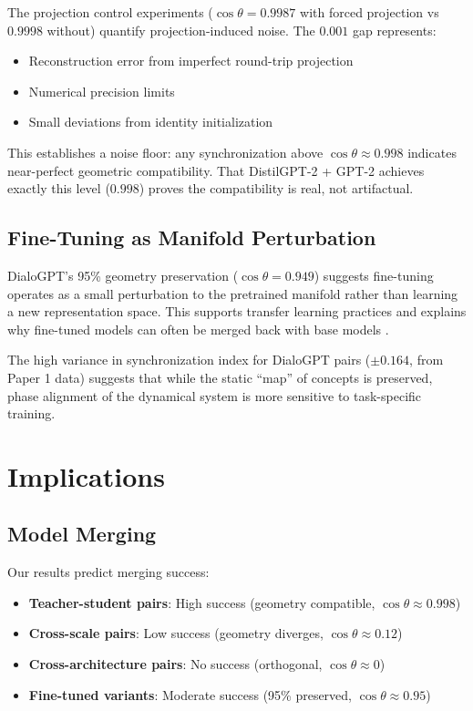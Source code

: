 \documentclass[10pt]{article} %
\theoremstyle{plain}
\theoremstyle{definition}
\theoremstyle{remark}
\begin{document}
The projection control experiments ($\cos \theta = 0.9987$ with forced projection vs $0.9998$ without) quantify projection-induced noise. The $0.001$ gap represents:
\begin{itemize}
    \item Reconstruction error from imperfect round-trip projection
    \item Numerical precision limits
    \item Small deviations from identity initialization
\end{itemize}

This establishes a noise floor: any synchronization above $\cos \theta \approx 0.998$ indicates near-perfect geometric compatibility. That DistilGPT-2 + GPT-2 achieves exactly this level ($0.998$) proves the compatibility is real, not artifactual.

\subsection{Fine-Tuning as Manifold Perturbation}

DialoGPT's 95\% geometry preservation ($\cos \theta = 0.949$) suggests fine-tuning operates as a small perturbation to the pretrained manifold rather than learning a new representation space. This supports transfer learning practices and explains why fine-tuned models can often be merged back with base models \citep{wortsman2022model}.

The high variance in synchronization index for DialoGPT pairs ($\pm 0.164$, from Paper 1 data) suggests that while the static ``map'' of concepts is preserved, phase alignment of the dynamical system is more sensitive to task-specific training.

\section{Implications}

\subsection{Model Merging}

Our results predict merging success:
\begin{itemize}
    \item \textbf{Teacher-student pairs}: High success (geometry compatible, $\cos \theta \approx 0.998$)
    \item \textbf{Cross-scale pairs}: Low success (geometry diverges, $\cos \theta \approx 0.12$)
    \item \textbf{Cross-architecture pairs}: No success (orthogonal, $\cos \theta \approx 0$)
    \item \textbf{Fine-tuned variants}: Moderate success (95\% preserved, $\cos \theta \approx 0.95$)
\end{itemize}
\end{document}
